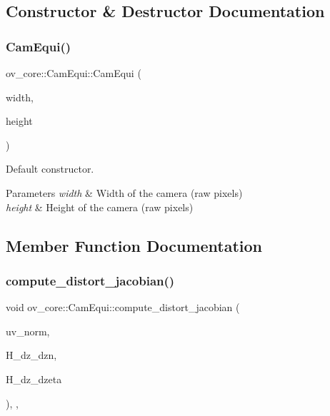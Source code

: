 \subsection{Constructor \& Destructor Documentation}
\mbox{\label{classov__core_1_1CamEqui_aac99e3cb833ebf47a7ba2db390ba5f66}} 
\subsubsection{\texorpdfstring{Cam\+Equi()}{CamEqui()}}
{\footnotesize\ttfamily ov\+\_\+core\+::\+Cam\+Equi\+::\+Cam\+Equi (\begin{DoxyParamCaption}\item[{int}]{width,  }\item[{int}]{height }\end{DoxyParamCaption})\hspace{0.3cm}{\ttfamily [inline]}}



Default constructor. 


\begin{DoxyParams}{Parameters}
{\em width} & Width of the camera (raw pixels) \\
\hline
{\em height} & Height of the camera (raw pixels) \\
\hline
\end{DoxyParams}


\subsection{Member Function Documentation}
\mbox{\label{classov__core_1_1CamEqui_a68692045d866fbd508a30aab7f3b0637}} 
\subsubsection{\texorpdfstring{compute\+\_\+distort\+\_\+jacobian()}{compute\_distort\_jacobian()}}
{\footnotesize\ttfamily void ov\+\_\+core\+::\+Cam\+Equi\+::compute\+\_\+distort\+\_\+jacobian (\begin{DoxyParamCaption}\item[{const Eigen\+::\+Vector2d \&}]{uv\+\_\+norm,  }\item[{Eigen\+::\+Matrix\+Xd \&}]{H\+\_\+dz\+\_\+dzn,  }\item[{Eigen\+::\+Matrix\+Xd \&}]{H\+\_\+dz\+\_\+dzeta }\end{DoxyParamCaption})\hspace{0.3cm}{\ttfamily [inline]}, {\ttfamily [override]}, {\ttfamily [virtual]}}




